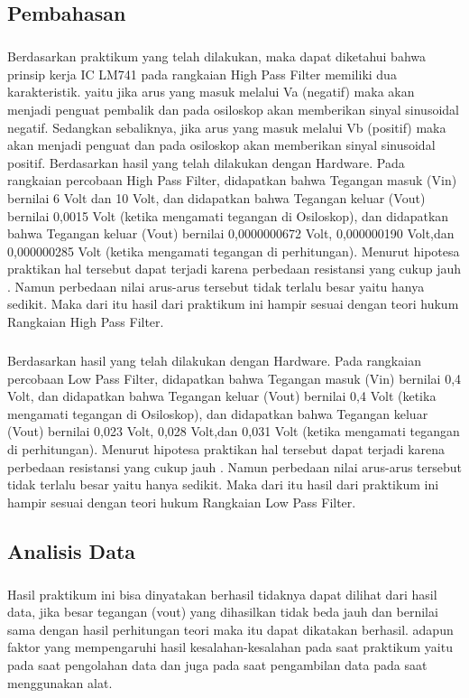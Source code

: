 \documentclass[12pt,a4paper]{article}
\begin{document}
\subsection{Pembahasan}
\subparagraph{ }
	Berdasarkan praktikum yang telah dilakukan, maka dapat diketahui bahwa prinsip kerja IC LM741 pada rangkaian High Pass Filter memiliki dua karakteristik. yaitu jika arus yang masuk melalui Va (negatif) maka akan menjadi penguat pembalik dan pada osiloskop akan memberikan sinyal sinusoidal negatif. Sedangkan sebaliknya, jika arus yang masuk melalui Vb (positif) maka akan menjadi penguat dan pada osiloskop akan memberikan sinyal sinusoidal positif.
	Berdasarkan hasil yang telah dilakukan dengan Hardware. Pada rangkaian percobaan High Pass Filter, didapatkan bahwa Tegangan masuk (Vin) bernilai 6 Volt dan 10 Volt, dan didapatkan bahwa Tegangan keluar (Vout) bernilai 0,0015 Volt (ketika mengamati tegangan di Osiloskop), dan didapatkan bahwa Tegangan keluar (Vout) bernilai 0,0000000672 Volt, 0,000000190 Volt,dan 0,000000285 Volt (ketika mengamati tegangan di perhitungan). Menurut hipotesa praktikan hal tersebut dapat terjadi karena perbedaan resistansi yang cukup jauh . Namun perbedaan nilai arus-arus tersebut tidak terlalu besar yaitu hanya sedikit. Maka dari itu hasil dari praktikum ini hampir sesuai dengan teori hukum Rangkaian High Pass Filter.
\subparagraph{ }
	Berdasarkan hasil yang telah dilakukan dengan Hardware. Pada rangkaian percobaan Low Pass Filter, didapatkan bahwa Tegangan masuk (Vin) bernilai 0,4 Volt, dan didapatkan bahwa Tegangan keluar (Vout) bernilai 0,4 Volt (ketika mengamati tegangan di Osiloskop), dan didapatkan bahwa Tegangan keluar (Vout) bernilai 0,023 Volt, 0,028 Volt,dan 0,031 Volt (ketika mengamati tegangan di perhitungan). Menurut hipotesa praktikan hal tersebut dapat terjadi karena perbedaan resistansi yang cukup jauh . Namun perbedaan nilai arus-arus tersebut tidak terlalu besar yaitu hanya sedikit. Maka dari itu hasil dari praktikum ini hampir sesuai dengan teori hukum Rangkaian Low Pass Filter.
\newpage
 
\subsection{Analisis Data}
\subparagraph{}
	Hasil praktikum ini bisa dinyatakan berhasil tidaknya dapat dilihat dari hasil data, jika besar tegangan (vout) yang dihasilkan tidak beda jauh dan bernilai sama dengan hasil perhitungan teori maka itu dapat dikatakan berhasil. adapun faktor yang mempengaruhi hasil kesalahan-kesalahan pada saat praktikum yaitu pada saat pengolahan data dan juga pada saat pengambilan data pada saat menggunakan alat.
 
\end{document}
